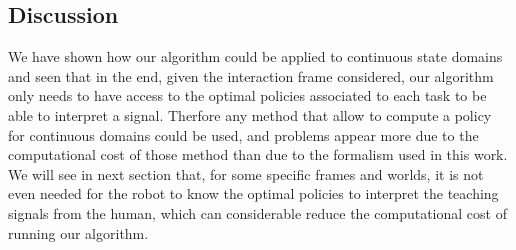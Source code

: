 \subsection{Discussion}

We have shown how our algorithm could be applied to continuous state domains and seen that in the end, given the interaction frame considered, our algorithm only needs to have access to the optimal policies associated to each task to be able to interpret a signal. Therfore any method that allow to compute a policy for continuous domains could be used, and problems appear more due to the computational cost of those method than due to the formalism used in this work. We will see in next section that, for some specific frames and worlds, it is not even needed for the robot to know the optimal policies to interpret the teaching signals from the human, which can considerable reduce the computational cost of running our algorithm.